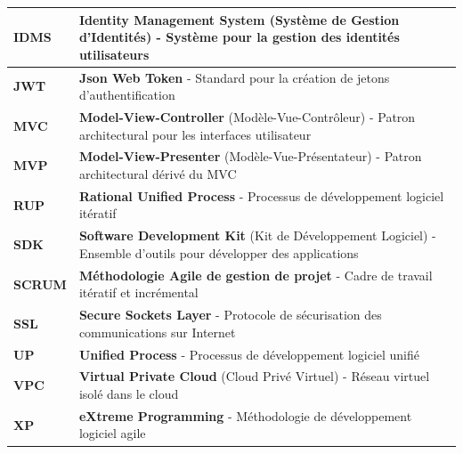 \begin{longtable}{p{3.5cm}>{\raggedright\arraybackslash}p{10.5cm}}
\hline
\textbf{IDMS} & \textbf{Identity Management System} (Système de Gestion d'Identités) - Système pour la gestion des identités utilisateurs \\
\hline
\textbf{JWT} & \textbf{Json Web Token} - Standard pour la création de jetons d'authentification \\
\hline
\textbf{MVC} & \textbf{Model-View-Controller} (Modèle-Vue-Contrôleur) - Patron architectural pour les interfaces utilisateur \\
\hline
\textbf{MVP} & \textbf{Model-View-Presenter} (Modèle-Vue-Présentateur) - Patron architectural dérivé du MVC \\
\hline
\textbf{RUP} & \textbf{Rational Unified Process} - Processus de développement logiciel itératif \\
\hline
\textbf{SDK} & \textbf{Software Development Kit} (Kit de Développement Logiciel) - Ensemble d'outils pour développer des applications \\
\hline
\textbf{SCRUM} & \textbf{Méthodologie Agile de gestion de projet} - Cadre de travail itératif et incrémental \\
\hline
\textbf{SSL} & \textbf{Secure Sockets Layer} - Protocole de sécurisation des communications sur Internet \\
\hline
\textbf{UP} & \textbf{Unified Process} - Processus de développement logiciel unifié \\
\hline
\textbf{VPC} & \textbf{Virtual Private Cloud} (Cloud Privé Virtuel) - Réseau virtuel isolé dans le cloud \\
\hline
\textbf{XP} & \textbf{eXtreme Programming} - Méthodologie de développement logiciel agile \\

\end{longtable}

\vspace{0.5cm}
\begin{center}
\end{center}